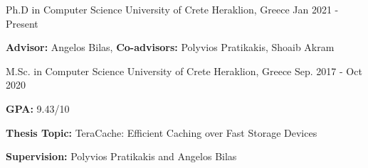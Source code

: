 
\begin{cventries}

  \cventry
    {Ph.D in Computer Science} %
    {University of Crete} %
    {Heraklion, Greece} %
    {Jan 2021 - Present} %
    {
      \begin{cvitems} %
	  \item{\textbf{Advisor:} Angelos Bilas, \textbf{Co-advisors:} Polyvios Pratikakis, Shoaib Akram}
      \end{cvitems}
    }

  \cventry
    {M.Sc. in Computer Science} %
    {University of Crete} %
    {Heraklion, Greece} %
    {Sep. 2017 - Oct 2020} %
    {
      \begin{cvitems} %
      \item{\textbf{GPA:} 9.43/10}
      \item{\textbf{Thesis Topic:} 
         TeraCache: Efficient Caching over Fast Storage Devices}
        \item{\textbf{Supervision:} Polyvios Pratikakis and Angelos Bilas}
      \end{cvitems}
    }


\end{cventries}
